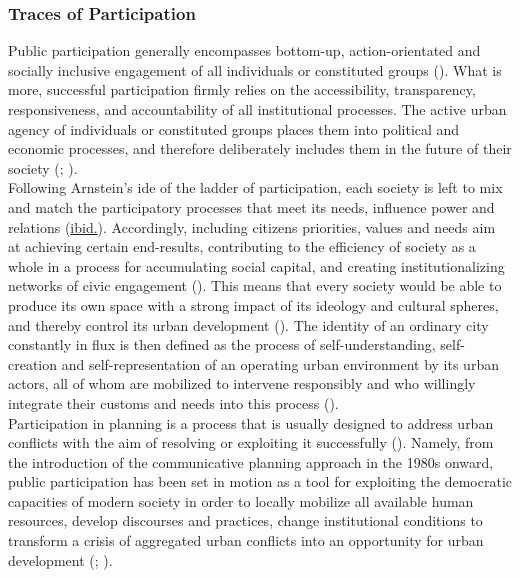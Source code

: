\documentclass[11pt]{report}
\begin{document}
{{{\subsubsection{Traces of Participation}

Public participation generally encompasses bottom-up, action-orientated and socially inclusive engagement of all individuals or constituted groups
(\href{UN}{\citealt{UN_building_2009}}). %
What is more, successful participation firmly relies on the accessibility, transparency, responsiveness, and accountability of all institutional processes. The active urban agency of individuals or constituted groups places them into political and economic processes, and therefore deliberately includes them in the future of their society
(\href{Arnstein}{\citealt{arnstein_ladder_1969}};
\href{Fisher}{\citealt{fisher_building_2001}}).
\\

Following Arnstein's ide of the ladder of participation, each society is left to mix and match the participatory processes that meet its needs, influence power and relations (\href{Fisher}{ibid.}).
Accordingly, including citizens priorities, values and needs aim at achieving certain end-results, contributing to the efficiency of society as a whole in a process for accumulating social capital, and creating institutionalizing networks of civic engagement (\href{Putnam}{\citealt{putnam_making_1993}}).
This means that every society would be able to produce its own space with a strong impact of its ideology and cultural spheres, and thereby control its urban development (\href{Lefebvre}{\citealt{lefebvre_production_1974}}). 
The identity of an ordinary city constantly in flux is then defined as the process of self-understanding, self-creation and self-representation of an operating urban environment by its urban actors, all of whom are mobilized to intervene responsibly and who willingly integrate their customs and needs into this process
(\href{Bolay}{\citealt{bolay_urban_2004}}).
\\

Participation in planning is a process that is usually designed to address urban conflicts with the aim of resolving or exploiting it successfully (\href{Fisher}{\citealt{fisher_building_2001}}).
Namely, from the introduction of the communicative planning approach in the 1980s onward, public participation has been set in motion as a tool for exploiting the democratic capacities of modern society in order to locally mobilize all available human resources, develop discourses and practices, change institutional conditions to transform a crisis of aggregated urban conflicts into an opportunity for urban development
(\href{Healey}{\citealt{healey_communicative_1996}}; \href{Scharpf}{\citealt{scharpf_XXX_1997}}).
\\

}}}
\end{document}
